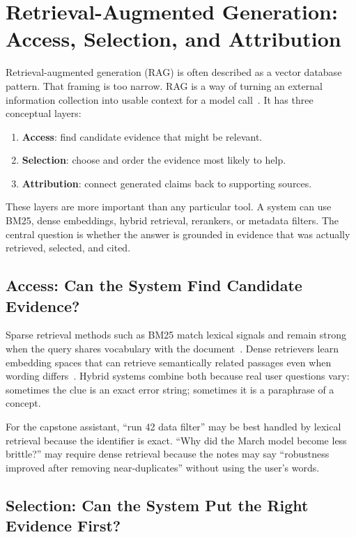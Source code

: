 \section{Retrieval-Augmented Generation: Access, Selection, and Attribution}
\label{sec:ch20-rag-access-selection-attribution}

Retrieval-augmented generation (RAG) is often described as a vector database pattern. That framing is too narrow. RAG is a way of turning an external information collection into usable context for a model call~\cite{lewis2020rag}. It has three conceptual layers:

\begin{enumerate}[nosep]
  \item \textbf{Access}: find candidate evidence that might be relevant.
  \item \textbf{Selection}: choose and order the evidence most likely to help.
  \item \textbf{Attribution}: connect generated claims back to supporting sources.
\end{enumerate}

These layers are more important than any particular tool. A system can use BM25, dense embeddings, hybrid retrieval, rerankers, or metadata filters. The central question is whether the answer is grounded in evidence that was actually retrieved, selected, and cited.

\subsection{Access: Can the System Find Candidate Evidence?}

Sparse retrieval methods such as BM25 match lexical signals and remain strong when the query shares vocabulary with the document~\cite{robertson2009probabilistic}. Dense retrievers learn embedding spaces that can retrieve semantically related passages even when wording differs~\cite{karpukhin2020dpr}. Hybrid systems combine both because real user questions vary: sometimes the clue is an exact error string; sometimes it is a paraphrase of a concept.

For the capstone assistant, ``run 42 data filter'' may be best handled by lexical retrieval because the identifier is exact. ``Why did the March model become less brittle?'' may require dense retrieval because the notes may say ``robustness improved after removing near-duplicates'' without using the user's words.

\subsection{Selection: Can the System Put the Right Evidence First?}

